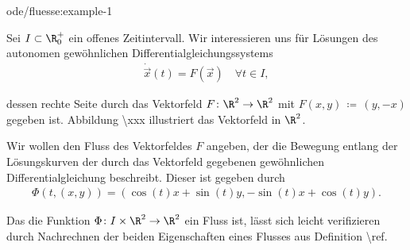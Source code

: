 \documentclass[letterpaper,10pt,english]{jupyterBook}
\begin{document}
\begin{example}{}{ode/fluesse:example-1}



\par
Sei \(I\subset \R_0^+\) ein offenes Zeitintervall.
Wir interessieren uns für Lösungen des autonomen gewöhnlichen Differentialgleichungssystems
\begin{align*}
\dot{\vec{x}}(t) = F(\vec{x}) \quad \forall t\in I,
\end{align*}
\par
dessen rechte Seite durch das Vektorfeld \(F \colon \R^2 \rightarrow \R^2\) mit \(F(x,y) \, \coloneqq \, (y, -x)\) gegeben ist.
Abbildung \textbackslash{}xxx illustriert das Vektorfeld in \(\R^2\).

\par
Wir wollen den Fluss des Vektorfeldes \(F\) angeben, der die Bewegung entlang der Lösungskurven der durch das Vektorfeld gegebenen gewöhnlichen Differentialgleichung beschreibt.
Dieser ist gegeben durch
\begin{align*}
\Phi(t,(x,y)) = (\cos(t)x + \sin(t)y, -\sin(t)x + \cos(t)y).
\end{align*}
\par
Das die Funktion \(\Phi \colon I \times \R^2 \rightarrow \R^2\) ein Fluss ist, lässt sich leicht verifizieren durch Nachrechnen der beiden Eigenschaften eines Flusses aus Definition \textbackslash{}ref.


\end{example}
\end{document}
